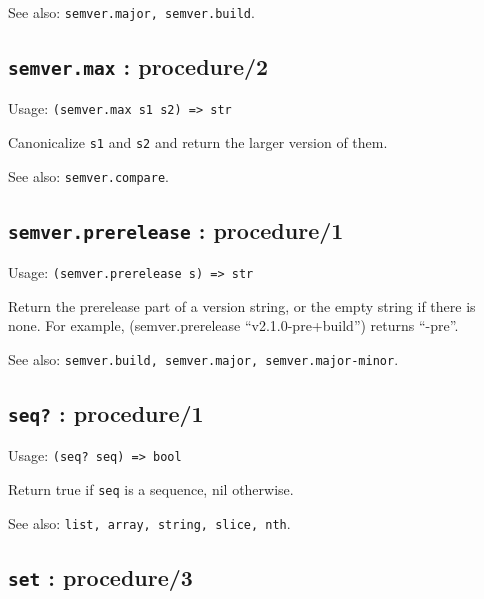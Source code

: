 \documentclass[
]{article}
\newcommand{\passthrough}[1]{#1}
\begin{document}
See also: \passthrough{\lstinline!semver.major, semver.build!}.

\hypertarget{semver.max-procedure2-1}{%
\subsection{\texorpdfstring{\texttt{semver.max} :
procedure/2}{semver.max : procedure/2}}\label{semver.max-procedure2-1}}

Usage: \passthrough{\lstinline!(semver.max s1 s2) => str!}

Canonicalize \passthrough{\lstinline!s1!} and
\passthrough{\lstinline!s2!} and return the larger version of them.

See also: \passthrough{\lstinline!semver.compare!}.

\hypertarget{semver.prerelease-procedure1-1}{%
\subsection{\texorpdfstring{\texttt{semver.prerelease} :
procedure/1}{semver.prerelease : procedure/1}}\label{semver.prerelease-procedure1-1}}

Usage: \passthrough{\lstinline!(semver.prerelease s) => str!}

Return the prerelease part of a version string, or the empty string if
there is none. For example, (semver.prerelease ``v2.1.0-pre+build'')
returns ``-pre''.

See also:
\passthrough{\lstinline!semver.build, semver.major, semver.major-minor!}.

\hypertarget{seq-procedure1-1}{%
\subsection{\texorpdfstring{\texttt{seq?} :
procedure/1}{seq? : procedure/1}}\label{seq-procedure1-1}}

Usage: \passthrough{\lstinline!(seq? seq) => bool!}

Return true if \passthrough{\lstinline!seq!} is a sequence, nil
otherwise.

See also: \passthrough{\lstinline!list, array, string, slice, nth!}.

\hypertarget{set-procedure3-1}{%
\subsection{\texorpdfstring{\texttt{set} :
procedure/3}{set : procedure/3}}\label{set-procedure3-1}}
\end{document}
